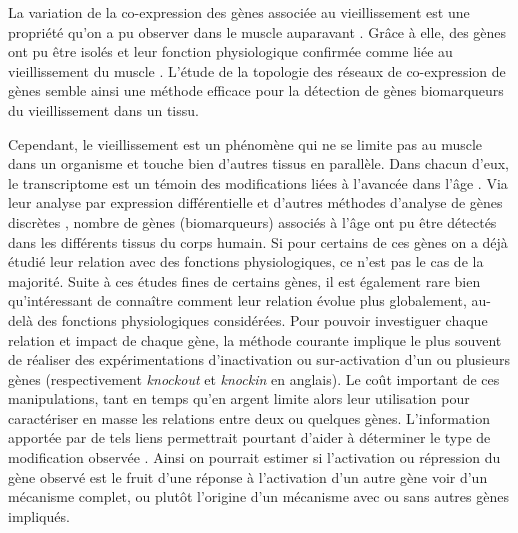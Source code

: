 La variation de la co-expression des gènes associée au vieillissement est une propriété qu'on a pu observer dans le muscle auparavant . Grâce à elle, des gènes ont pu être isolés et leur fonction physiologique  confirmée comme liée au vieillissement du muscle . L'étude de la topologie des réseaux de co-expression de gènes semble ainsi une méthode efficace pour la détection de gènes biomarqueurs du vieillissement dans un tissu. 

Cependant, le vieillissement est un phénomène qui ne se limite pas au muscle dans un organisme et touche bien d'autres tissus en parallèle. Dans chacun d'eux, le transcriptome est un témoin des modifications liées à l'avancée dans l'âge . Via leur analyse par expression différentielle et d'autres méthodes d'analyse de gènes discrètes , nombre de gènes (biomarqueurs) associés à l'âge ont pu être détectés dans les différents tissus du corps humain. Si pour certains de ces gènes on a déjà étudié leur relation avec des fonctions physiologiques, ce n'est pas le cas de la majorité. Suite à ces études fines de certains gènes, il est également rare bien qu'intéressant de connaître comment leur relation évolue plus globalement, au-delà des fonctions physiologiques considérées.
Pour pouvoir investiguer chaque relation et impact de chaque gène, la méthode courante implique le plus souvent de réaliser des expérimentations d'inactivation ou sur-activation d'un ou plusieurs gènes (respectivement \textit{knockout} et \textit{knockin} en anglais). Le coût important de ces manipulations, tant en temps qu'en argent limite alors leur utilisation pour caractériser en masse les relations entre deux ou quelques gènes. 
L'information apportée par de tels liens permettrait pourtant d'aider à déterminer le type de modification observée . Ainsi on pourrait estimer si l'activation ou répression du gène observé est le fruit d'une réponse à l'activation d'un autre gène voir d'un mécanisme  complet, ou plutôt l'origine d'un mécanisme avec ou sans autres gènes impliqués.


